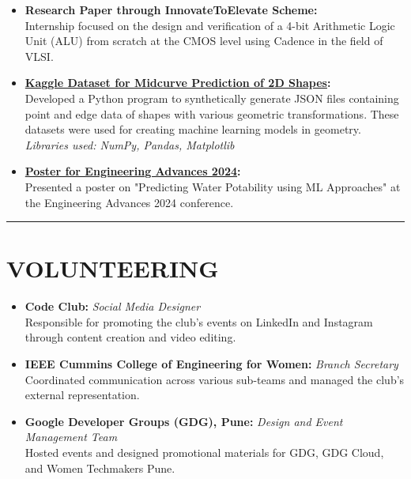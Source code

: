 \documentclass[a4paper,10pt]{article}
\begin{document}
\begin{paracol}{2}
\begin{itemize}
			\item \textbf{Research Paper through InnovateToElevate Scheme:}\\
			Internship focused on the design and verification of a 4-bit Arithmetic Logic Unit (ALU) from scratch at the CMOS level using Cadence in the field of VLSI.
			
			\item \textbf{\href{https://www.kaggle.com/datasets/anushkaykulkarni/midcurvenn-linegraphs}{Kaggle Dataset for Midcurve Prediction of 2D Shapes}:}\\
			Developed a Python program to synthetically generate JSON files containing point and edge data of shapes with various geometric transformations. These datasets were used for creating machine learning models in geometry. \\
			\textit{Libraries used: NumPy, Pandas, Matplotlib}
			
			\item \textbf{\href{https://drive.google.com/file/d/1J5h5wK-NsolEpNHerocv-4T25yTHo-_N/view?usp=sharing}{Poster for Engineering Advances 2024}:}\\
			Presented a poster on "Predicting Water Potability using ML Approaches" at the Engineering Advances 2024 conference.
			
		\end{itemize}
	\vspace{1em}
	
		
	\hrule
	\section*{VOLUNTEERING}
		\begin{itemize}
		
			\item \textbf{Code Club:} \textit{Social Media Designer}\\
			Responsible for promoting the club's events on LinkedIn and Instagram through content creation and video editing.
			
			\item \textbf{IEEE Cummins College of Engineering for Women:} \textit{Branch Secretary}\\
			Coordinated communication across various sub-teams and managed the club's external representation.
			
			\item \textbf{Google Developer Groups (GDG), Pune:} \textit{Design and Event Management Team}\\
			Hosted events and designed promotional materials for GDG, GDG Cloud, and Women Techmakers Pune.
			

\end{itemize}
\end{paracol}
\end{document}
